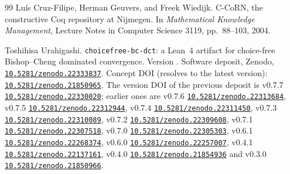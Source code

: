 \documentclass[11pt]{article}
\theoremstyle{definition}
\theoremstyle{remark}
\newcommand{\doi}[1]{\href{https://doi.org/#1}{\texttt{#1}}}
\begin{document}
\begin{thebibliography}{99}
 Lu\'is Cruz-Filipe, Herman Geuvers, and Freek Wiedijk.
\newblock C-CoRN, the constructive Coq repository at Nijmegen.
\newblock In \emph{Mathematical Knowledge Management}, Lecture Notes in Computer Science 3119, pp.~88--103, 2004.

Toshihisa Urahigashi.
\newblock \texttt{choicefree-bc-dct}: a Lean~4 artifact for choice-free Bishop--Cheng dominated convergence.
\newblock Version \CFBDCTVersion.  Software deposit, Zenodo, \doi{10.5281/zenodo.22333837}.
\newblock Concept DOI (resolves to the latest version): \doi{10.5281/zenodo.21850965}.  The version DOI of the previous deposit is v0.7.7 \doi{10.5281/zenodo.22330020}; earlier ones are v0.7.6 \doi{10.5281/zenodo.22313684}, v0.7.5 \doi{10.5281/zenodo.22312944}, v0.7.4 \doi{10.5281/zenodo.22311450}, v0.7.3 \doi{10.5281/zenodo.22310089}, v0.7.2 \doi{10.5281/zenodo.22309608}, v0.7.1 \doi{10.5281/zenodo.22307518}, v0.7.0 \doi{10.5281/zenodo.22305303}, v0.6.1 \doi{10.5281/zenodo.22268374}, v0.6.0 \doi{10.5281/zenodo.22257007}, v0.4.1 \doi{10.5281/zenodo.22137161}, v0.4.0 \doi{10.5281/zenodo.21854936} and v0.3.0 \doi{10.5281/zenodo.21850966}.

\end{thebibliography}
\end{document}
